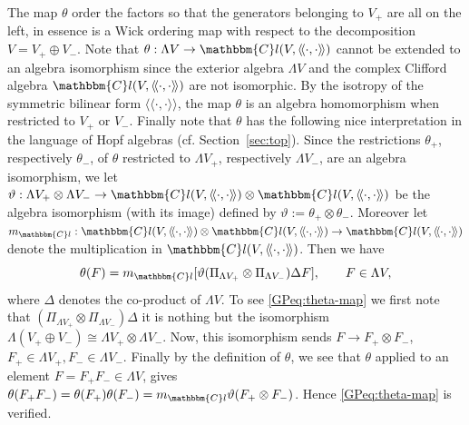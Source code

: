\documentclass[11pt]{article}
\newcommand{\assign}{:=}
\newcommand{\cdummy}{\cdot}
\newcommand{\llangle}{{\langle\!\langle}}
\newcommand{\rrangle}{{\rangle\!\rangle}}
\begin{document}
\begin{remark}
  \label{GPrem:theta-map}The map $\theta$ order the factors so that the
  generators belonging to $V_+$ are all on the left, in essence is a Wick
  ordering map with respect to the decomposition $V = V_+ \oplus V_-$. Note
  that $\theta : \Lambda V \rightarrow \mathbbm{C}l (V, \llangle \cdummy,
  \cdummy \rrangle)$ cannot be extended to an algebra isomorphism since the
  exterior algebra $\Lambda V$ and the complex Clifford algebra $\mathbbm{C}l
  (V, \llangle \cdummy, \cdummy \rrangle)$ are not isomorphic. By the isotropy
  of the symmetric bilinear form $\llangle \cdummy, \cdummy \rrangle$, the map
  $\theta$ is an algebra homomorphism when restricted to $V_+$ or $V_-$.
  Finally note that $\theta$ has the following nice interpretation in the
  language of Hopf algebras (cf. Section~\ref{sec:top}). Since the
  restrictions $\theta_+$, respectively $\theta_-$, of $\theta$ restricted to
  $\Lambda V_+$, respectively $\Lambda V_-$, are an algebra isomorphism, we
  let $\vartheta : \Lambda V_+ \otimes \Lambda V_- \rightarrow \mathbbm{C}l (V,
  \llangle \cdummy, \cdummy \rrangle) \otimes \mathbbm{C}l (V, \llangle
  \cdummy, \cdummy \rrangle)$ be the algebra isomorphism (with its image)
  defined by $\vartheta \assign \theta_+ \otimes \theta_-$. Moreover let
  $m_{\mathbbm{C}l} : \mathbbm{C}l (V, \llangle \cdummy, \cdummy \rrangle)
  \otimes \mathbbm{C}l (V, \llangle \cdummy, \cdummy \rrangle) \rightarrow
  \mathbbm{C}l (V, \llangle \cdummy, \cdummy \rrangle)$ denote the
  multiplication in $\mathbbm{C}l (V, \llangle \cdummy, \cdummy \rrangle)$.
  Then we have
  \begin{equation}
    \theta (F) = m_{\mathbbm{C}l} [\vartheta (\Pi_{\Lambda V_+} \otimes
    \Pi_{\Lambda V_-}) \Delta F], \qquad F \in \Lambda V,
    \label{GPeq:theta-map}
  \end{equation}
  where $\Delta$ denotes the co-product of $\Lambda V$. To see
  {\eqref{GPeq:theta-map}} we first note that $(\Pi_{\Lambda V_+} \otimes
  \Pi_{\Lambda V_-}) \Delta$ it is nothing but the isomorphism $\Lambda (V_+
  \oplus V_-) \cong \Lambda V_+ \otimes \Lambda V_-$. Now, this isomorphism
  sends $F \rightarrow F_+ \otimes F_-$, $F_+ \in \Lambda V_+, F_- \in \Lambda
  V_-$. Finally by the definition of $\theta$, we see that $\theta$ applied to
  an element $F = F_+ F_- \in \Lambda V$, gives $\theta (F_+ F_-) = \theta
  (F_+) \theta (F_-) = m_{\mathbbm{C}l} \vartheta (F_+ \otimes F_-)$. Hence
  {\eqref{GPeq:theta-map}} is verified.
\end{remark}
\end{document}
